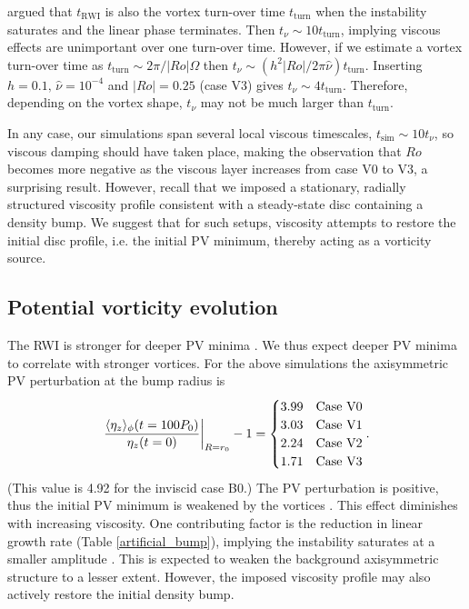 \cite{meheut13} argued that $t_\mathrm{RWI}$ is also the vortex
turn-over time $t_\mathrm{turn}$ when the instability saturates and
the linear phase terminates. Then 
$t_\nu\sim 10 t_\mathrm{turn}$, implying viscous effects 
are unimportant over one turn-over time. 
However, if we estimate a vortex turn-over time as $t_\mathrm{turn}
\sim 2\pi/|Ro|\Omega$ then $t_\nu\sim (h^2|Ro|/2\pi\hat{\nu})t_\mathrm{turn}$.  
Inserting $h=0.1,\,\hat{\nu}=10^{-4}$ and $|Ro|=0.25$ (case V3) gives 
$t_\nu \sim 4t_\mathrm{turn}$. Therefore, depending on the vortex shape, 
$t_\nu$ may not be much larger than $t_\mathrm{turn}$. 

In any case, our simulations span several local viscous timescales, 
$t_\mathrm{sim}\sim 10t_\nu $, so viscous damping should have taken
place, making the observation that $Ro$ becomes more negative as the 
viscous layer increases from case V0 to V3, a surprising
result. However, recall that we imposed a stationary, radially
structured viscosity profile consistent with a steady-state disc
containing a density bump. We suggest that for such setups, viscosity
attempts to restore the initial disc profile, i.e. the initial PV
minimum, thereby acting as a vorticity source.      

\subsection{Potential vorticity evolution}
The RWI is stronger for deeper PV minima \citep{li00}. We 
thus expect deeper PV minima to correlate with stronger vortices.   
For the above simulations the axisymmetric PV perturbation at the bump
radius is   
\begin{align}\label{vortensity_pert}
  \left.\frac{\langle \eta_z \rangle_\phi(t=100P_0)}{\eta_z(t=0)}\right|_{R=r_0} - 1 = 
  \begin{cases}
    3.99  & \text{Case V0} \\
   3.03  & \text{Case V1} \\
   2.24  & \text{Case V2} \\
   1.71  & \text{Case V3} \\
  \end{cases}.
\end{align} 
(This value is 4.92 for the inviscid case B0.) The PV 
perturbation is positive, thus the initial PV minimum is weakened
by the vortices \citep{meheut10}. This effect
diminishes with increasing viscosity. One contributing factor 
is the reduction in linear growth rate (Table 
\ref{artificial_bump}), implying the  
instability saturates at a smaller amplitude \citep{meheut13}. This  
is expected to weaken the background axisymmetric structure to a lesser
extent. However, the imposed viscosity profile may also actively
restore the initial density bump.     

